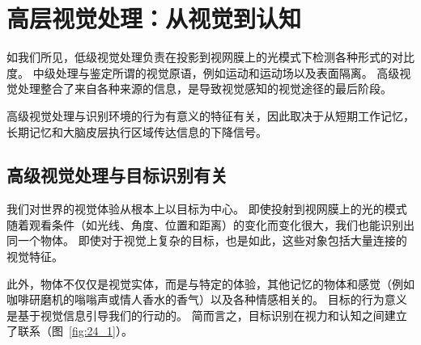 \chapter{高层视觉处理：从视觉到认知} \label{chap:chap24}

如我们所见，低级视觉处理负责在投影到视网膜上的光模式下检测各种形式的对比度。
中级处理与鉴定所谓的视觉原语，例如运动和运动场以及表面隔离。
高级视觉处理整合了来自各种来源的信息，是导致视觉感知的视觉途径的最后阶段。


高级视觉处理与识别环境的行为有意义的特征有关，因此取决于从短期工作记忆，长期记忆和大脑皮层执行区域传达信息的下降信号。


\section{高级视觉处理与目标识别有关}

我们对世界的视觉体验从根本上以目标为中心。
即使投射到视网膜上的光的模式随着观看条件（如光线、角度、位置和距离）的变化而变化很大，我们也能识别出同一个物体。
即使对于视觉上复杂的目标，也是如此，这些对象包括大量连接的视觉特征。


此外，物体不仅仅是视觉实体，而是与特定的体验，其他记忆的物体和感觉（例如咖啡研磨机的嗡嗡声或情人香水的香气）以及各种情感相关的。
目标的行为意义是基于视觉信息引导我们的行动的。
简而言之，目标识别在视力和认知之间建立了联系（图~\ref{fig:24_1}）。


